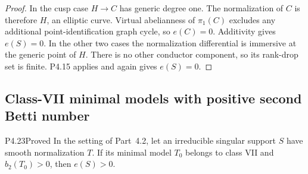 \begin{proof}
In the cusp case $H\to C$ has generic degree one.
The normalization of $C$ is therefore $H$, an elliptic
curve. Virtual abelianness of $\pi_1(C)$ excludes any
additional point-identification graph cycle, so
$e(C)=0$. Additivity gives $e(S)=0$. In the other two
cases the normalization differential is immersive at
the generic point of $H$. There is no other conductor
component, so its rank-drop set is finite. P4.15
applies and again gives $e(S)=0$.
\end{proof}


\subsection{Class-VII minimal models with positive second Betti number}

\begin{statement}{P4.23}{Proved}
In the setting of Part~4.2, let an irreducible singular support
$S$ have smooth normalization $T$. If its minimal model $T_0$
belongs to class VII and $b_2(T_0)>0$, then $e(S)>0$.
\end{statement}
